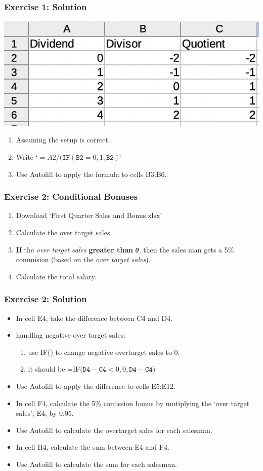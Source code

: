 \documentclass[12pt]{beamer}
\begin{document}
	\begin{frame}
		\frametitle{Exercise 1: Solution}
		\begin{center}
			\includegraphics[width= 0.6 \textwidth]{Exercise1Soln.png}
		\end{center}
		\begin{enumerate}
			\item Assuming the setup is correct...
			\item Write `$= A2 / (\texttt{IF}(\texttt{B2}=0, 1, \texttt{B2})$'
			\item Use Autofill to apply the formula to cells B3:B6. 
			 
		\end{enumerate}
	\end{frame}
	\begin{frame}
		\frametitle{Exercise 2: Conditional Bonuses}
		\begin{enumerate}
			\item Download `First Quarter Sales and Bonus.xlsx'
			\item Calculate the over target sales.
			\item \textbf{If} the\textit{ over target sales} \textbf{greater than} \textit{\texttt{0}}, then the sales man gets a 5\% commision (based on the \textit{over target sales}). 
			\item Calculate the total salary.   
		\end{enumerate}
	\end{frame}
	\begin{frame}
		\frametitle{Exercise 2: Solution}
		\begin{itemize}
			\item In cell E4, take the difference between C4 and D4.
			\item handling negative over target sales:\begin{enumerate}
				\item use IF() to change negative overtarget sales to 0. 
				\item it should be =IF($\texttt{D4}-\texttt{C4}< 0, 0, \texttt{D4} -\texttt{C4}$)
				\end{enumerate}
			\item Use Autofill to apply the difference to cells E5:E12. 
			\item In cell F4, calculate the 5\% comission bonus by mutiplying the `over target sales', E4, by 0.05. 
			\item Use Autofill to calculate the overtarget sales for each salesman. 
			\item In cell H4, calculate the sum between E4 and F4.
			\item Use Autofill to calculate the sum for each salesman. 
		\end{itemize}
	\end{frame}
\end{document}
